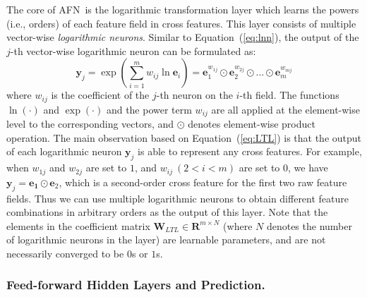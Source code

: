 \documentclass[letterpaper]{article} \usepackage{aaai20}  \usepackage{times}  \usepackage{helvet} \usepackage{courier}  \usepackage[hyphens]{url}  \usepackage{graphicx} \urlstyle{rm} \def\UrlFont{\rm}  \usepackage{graphicx}  \frenchspacing  \setlength{\pdfpagewidth}{8.5in}  \setlength{\pdfpageheight}{11in}
\newcommand{\model}{{AFN}~}
\begin{document}
The core of \model is the logarithmic transformation layer which learns the powers (i.e., orders) of each feature field in cross features.
This layer consists of multiple vector-wise \emph{logarithmic neurons}. Similar to Equation~(\ref{eq:lnn}), the output of the $j$-th vector-wise logarithmic neuron can be formulated as:
\begin{equation}
\label{eq:LTL}
\mathbf{y}_j = \exp(\sum_{i=1}^m w_{ij}\ln \mathbf{e}_i )
=\mathbf{e}_1^{w_{1j}}\odot\mathbf{e}_2^{w_{2j}}\odot...\odot\mathbf{e}_m^{w_{mj}}
\end{equation}
where $w_{ij}$ is the coefficient of the $j$-th neuron on the $i$-th field. The functions $\ln(\cdot)$ and $\exp(\cdot)$ and the power term $w_{ij}$ are all applied at the element-wise level to the corresponding vectors, and $\odot$ denotes element-wise product operation.
The main observation based on Equation~(\ref{eq:LTL}) is that the output of each logarithmic neuron $\mathbf{y}_j$ is able to represent any cross features. For example, when ${w_{1j}}$ and ${w_{2j}}$ are set to $1$, and ${w_{ij}} \ (2<i<m)$ are set to $0$, we have $\mathbf{y}_j=\mathbf{e_1}\odot\mathbf{e}_2$, which is a second-order cross feature for the first two raw feature fields.
Thus we can use multiple logarithmic neurons to obtain different feature combinations in arbitrary orders as the output of this layer.
Note that the elements in the coefficient matrix $\mathbf{W}_{LTL}\in \mathbf{R}^{m\times N}$ (where $N$ denotes the number of logarithmic neurons in the layer) are learnable parameters, and are not necessarily converged to be $0$s or $1$s.  

\subsubsection{Feed-forward Hidden Layers and Prediction.}
\end{document}
